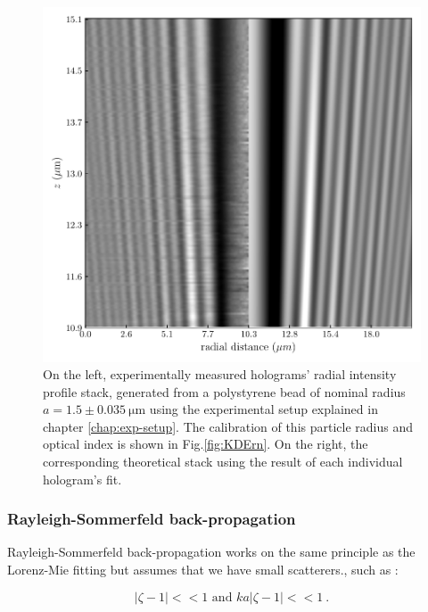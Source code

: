 \begin{figure}
	\centering
	\includegraphics{02_body/chapter2/images/test_tableau2.pdf}
	\caption{On the left, experimentally measured  holograms' radial intensity profile stack, generated from a polystyrene bead of nominal radius $a = 1.5 \pm 0.035 ~ \mathrm{\mu m} $ using the experimental setup explained in chapter \ref{chap:exp-setup}. The calibration of this particle radius and optical index is shown in Fig.\ref{fig:KDErn}. On the right, the corresponding theoretical stack using the result of each individual hologram's fit.}
\end{figure}

\newpage

\subsubsection{ Rayleigh-Sommerfeld back-propagation}





Rayleigh-Sommerfeld back-propagation \cite{wilson_3d_2012} works on the same principle as the Lorenz-Mie fitting but assumes that we have small scatterers., such as :

\begin{equation}
	|\zeta - 1| << 1 \text{ and } ka|\zeta - 1| << 1 ~.
\end{equation}

